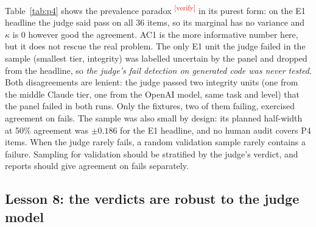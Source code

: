\documentclass[10pt,a4paper]{article}
\newcommand{\citeneeded}[1]{\cite{#1}\textsuperscript{\textcolor{red}{\tiny[verify]}}}
\begin{document}
Table~\ref{tab:p4} shows the prevalence paradox \cite{feinstein1990high}\citeneeded{byrt1993bias} in its purest
form: on the E1 headline the judge said pass on all 36 items, so its marginal has no variance and $\kappa$ is 0
however good the agreement. AC1 \cite{gwet2008ac1} is the more informative number here, but it does not rescue the
real problem. The only E1 unit the judge failed in the sample (smallest tier, integrity) was labelled uncertain by
the panel and dropped from the headline, so \emph{the judge's fail detection on generated code was never tested}.
Both disagreements are lenient: the judge passed two integrity units (one from the middle Claude tier, one from the
OpenAI model, same task and level) that the panel failed in both runs. Only the fixtures, two of them failing,
exercised agreement on fails.
The sample was also small by design: its planned half-width at 50\% agreement was $\pm 0.186$ for the E1 headline,
and no human audit covers P4 items.
When the judge rarely fails, a random validation sample rarely contains a failure. Sampling for validation
should be stratified by the judge's verdict, and reports should give agreement on fails separately.

\subsection{Lesson 8: the verdicts are robust to the judge model}\label{sec:l8robust}
\end{document}
